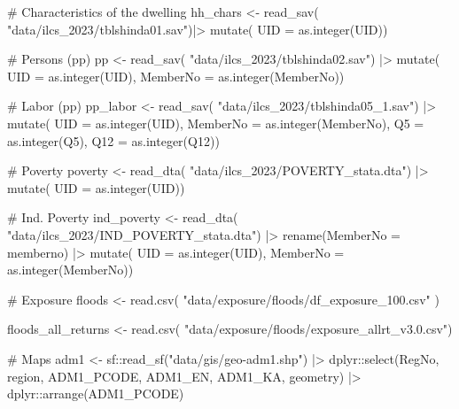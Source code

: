 \documentclass[
  letterpaper,
  DIV=11,
  numbers=noendperiod]{scrartcl}
\newenvironment{Shaded}{}{}
\newcommand{\AttributeTok}[1]{\textcolor[rgb]{0.84,0.23,0.29}{#1}}
\newcommand{\CommentTok}[1]{\textcolor[rgb]{0.42,0.45,0.49}{#1}}
\newcommand{\FunctionTok}[1]{\textcolor[rgb]{0.44,0.26,0.76}{#1}}
\newcommand{\NormalTok}[1]{\textcolor[rgb]{0.14,0.16,0.18}{#1}}
\newcommand{\OtherTok}[1]{\textcolor[rgb]{0.44,0.26,0.76}{#1}}
\newcommand{\SpecialCharTok}[1]{\textcolor[rgb]{0.00,0.36,0.77}{#1}}
\newcommand{\StringTok}[1]{\textcolor[rgb]{0.01,0.18,0.38}{#1}}
\begin{document}
\begin{Shaded}
\begin{Highlighting}[]
\CommentTok{\# Characteristics of the dwelling}
\NormalTok{hh\_chars }\OtherTok{\textless{}{-}} \FunctionTok{read\_sav}\NormalTok{(}
  \StringTok{"data/ilcs\_2023/tblshinda01.sav"}\NormalTok{)}\SpecialCharTok{|\textgreater{}}
  \FunctionTok{mutate}\NormalTok{(}
    \AttributeTok{UID =} \FunctionTok{as.integer}\NormalTok{(UID))}

\CommentTok{\# Persons (pp)}
\NormalTok{pp }\OtherTok{\textless{}{-}} \FunctionTok{read\_sav}\NormalTok{(}
  \StringTok{"data/ilcs\_2023/tblshinda02.sav"}\NormalTok{) }\SpecialCharTok{|\textgreater{}} 
  \FunctionTok{mutate}\NormalTok{(}
    \AttributeTok{UID =} \FunctionTok{as.integer}\NormalTok{(UID),}
    \AttributeTok{MemberNo =} \FunctionTok{as.integer}\NormalTok{(MemberNo))}

\CommentTok{\# Labor (pp)}
\NormalTok{pp\_labor }\OtherTok{\textless{}{-}} \FunctionTok{read\_sav}\NormalTok{(}
  \StringTok{"data/ilcs\_2023/tblshinda05\_1.sav"}\NormalTok{) }\SpecialCharTok{|\textgreater{}} 
  \FunctionTok{mutate}\NormalTok{(}
    \AttributeTok{UID =} \FunctionTok{as.integer}\NormalTok{(UID),}
    \AttributeTok{MemberNo =} \FunctionTok{as.integer}\NormalTok{(MemberNo),}
    \AttributeTok{Q5  =} \FunctionTok{as.integer}\NormalTok{(Q5),}
    \AttributeTok{Q12 =} \FunctionTok{as.integer}\NormalTok{(Q12)) }

\CommentTok{\# Poverty}
\NormalTok{poverty }\OtherTok{\textless{}{-}} \FunctionTok{read\_dta}\NormalTok{(}
  \StringTok{"data/ilcs\_2023/POVERTY\_stata.dta"}\NormalTok{) }\SpecialCharTok{|\textgreater{}} 
  \FunctionTok{mutate}\NormalTok{(}
    \AttributeTok{UID =} \FunctionTok{as.integer}\NormalTok{(UID))}

\CommentTok{\# Ind. Poverty}
\NormalTok{ind\_poverty }\OtherTok{\textless{}{-}} \FunctionTok{read\_dta}\NormalTok{(}
  \StringTok{"data/ilcs\_2023/IND\_POVERTY\_stata.dta"}\NormalTok{) }\SpecialCharTok{|\textgreater{}} 
  \FunctionTok{rename}\NormalTok{(}\AttributeTok{MemberNo =}\NormalTok{ memberno) }\SpecialCharTok{|\textgreater{}} 
  \FunctionTok{mutate}\NormalTok{(}
    \AttributeTok{UID =} \FunctionTok{as.integer}\NormalTok{(UID),}
    \AttributeTok{MemberNo =} \FunctionTok{as.integer}\NormalTok{(MemberNo))}

\CommentTok{\# Exposure}
\NormalTok{floods }\OtherTok{\textless{}{-}} \FunctionTok{read.csv}\NormalTok{(}
  \StringTok{"data/exposure/floods/df\_exposure\_100.csv"}
\NormalTok{)}

\NormalTok{floods\_all\_returns }\OtherTok{\textless{}{-}} \FunctionTok{read.csv}\NormalTok{(}
  \StringTok{"data/exposure/floods/exposure\_allrt\_v3.0.csv"}\NormalTok{)}

\CommentTok{\# Maps}
\NormalTok{adm1 }\OtherTok{\textless{}{-}}\NormalTok{ sf}\SpecialCharTok{::}\FunctionTok{read\_sf}\NormalTok{(}\StringTok{"data/gis/geo{-}adm1.shp"}\NormalTok{) }\SpecialCharTok{|\textgreater{}} 
\NormalTok{  dplyr}\SpecialCharTok{::}\FunctionTok{select}\NormalTok{(RegNo, region, ADM1\_PCODE, ADM1\_EN, ADM1\_KA, geometry) }\SpecialCharTok{|\textgreater{}} 
\NormalTok{  dplyr}\SpecialCharTok{::}\FunctionTok{arrange}\NormalTok{(ADM1\_PCODE)}
\end{Highlighting}
\end{Shaded}
\end{document}
